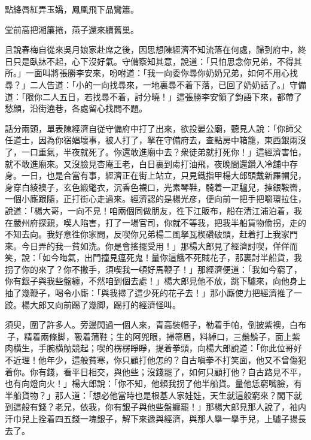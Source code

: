\begin{myquote}
點絳唇紅弄玉嬌，鳳凰飛下品鸞簫。

堂前高把湘簾捲，燕子還來續舊巢。
\end{myquote}

且說春梅自從來吳月娘家赴席之後，因思想陳經濟不知流落在何處，歸到府中，終日只是臥牀不起，心下沒好氣。守備察知其意，說道：「只怕思念你兄弟，不得其所。」一面叫將張勝李安來，吩咐道：「我一向委你尋你奶奶兄弟，如何不用心找尋？」二人告道：「小的一向找尋來，一地裏尋不着下落，已回了奶奶話了。」守備道：「限你二人五日，若找尋不着，討分曉！」這張勝李安領了鈞語下來，都帶了愁顔，沿街遶巷，各處留心找問不題。

話分兩頭，單表陳經濟自従守備府中打了出來，欲投晏公廟，聽見人說：「你師父任道士，因為你宿娼壞事，被人打了，拏在守備府去，查點房中箱籠，東西銀兩沒了，一口重氣，半夜就死了。你還敢進廟中去？衆徒弟就打死你！」這經濟害怕，就不敢進廟來。又沒臉見杏庵王老，白日裏到䖏打油飛，夜晚間還鑽入冷舖中存身。一日，也是合當有事，經濟正在街上站立，只見鐵指甲楊大郎頭戴新羅帽兒，身穿白綾襖子，玄色緞氅衣，沉香色襪口，光素琴鞋，騎着一疋驢兒，揀銀鞍轡，一個小廝跟隨，正打街心走過來。經濟認的是楊光彦，便向前一把手把嚼環拉住，說道：「楊大哥，一向不見！咱兩個同做朋友，徃下江販布，船在清江浦泊着，我在嚴州府探親，喫人陷害，打了一場官司，你就不等我，把我半船貨物偸拐，走的不知去向。我好意徃你家問，反喫你兄弟楊二風拏瓦楔礸破頭，赶着打上我家門來。今日弄的我一貧如洗。你是會搖擺受用！」那楊大郎見了經濟討喫，佯佯而笑，說：「如今晦氣，出門撞見瘟死鬼！量你這餓不死賊花子，那裏討半船貨，我拐了你的來了？你不撒手，須喫我一頓好馬鞭子！」那經濟便道：「我如今窮了，你有銀子與我些盤纏，不然咱到個去處！」楊大郎見他不放，跳下驢來，向他身上抽了幾鞭子，喝令小廝：「與我撏了這少死的花子去！」那小廝使力把經濟推了一跤。楊大郎又向前踢了幾脚，踢打的經濟怪叫。

須臾，圍了許多人。旁邊閃過一個人來，青高裝帽子，勒着手帕，倒披紫襖，白布𧜽子，精着兩條脚，靸着蒲鞋；生的阿兜眼，掃箒眉，料綽口，三鬚鬍子，面上紫肉横生，手腕横觔競起；喫的楞楞睜睜，提着拳頭，向楊大郎說道：「你此位哥好不近理！他年少，這般貧寒，你只顧打他怎的？自古嗔拳不打笑面，他又不曾傷犯着你。你有錢，看平日相交，與他些；沒錢罷了，如何只顧打他？自古路見不平，也有向燈向火！」楊大郎說：「你不知，他賴我拐了他半船貨。量他恁窮嘴臉，有半船貨物？」那人道：「想必他當時也是根基人家娃娃，天生就這般窮來？閣下就到這般有錢？老兄，依我，你有銀子與他些盤纏罷！」那楊大郎見那人說了，袖内汗巾兒上拴着四五錢一塊銀子，解下來遞與經濟，與那人擧一擧手兒，上驢子揚長去了。

